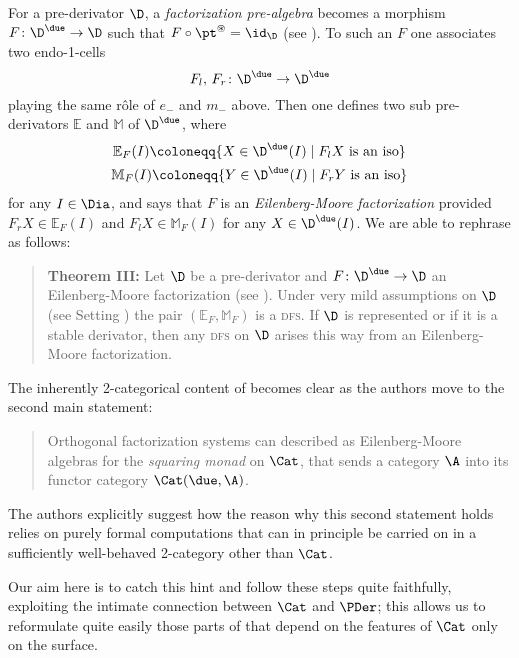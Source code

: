For a pre-derivator $\D$, a \emph{factorization pre-algebra}  becomes a morphism  $F\colon \D^\due\to \D$ such that $F\circ \pt^\circledast=\id_\D$ (see \adef{}). To such an $F$ one associates two endo-1-cells
\[
F_l,\, F_r\colon \D^\due\to \D^\due
\]
playing the same r\^ole of $e_{-}$ and $m_{-}$ above. Then one defines two sub pre-derivators $\mathbb E$ and $\mathbb M$ of $\D^\due$, where
\begin{gather*}
\mathbb E_F(I) \coloneqq \{X\in \D^\due(I) \mid F_lX\text{ is an iso}\}\\
\mathbb M_F(I) \coloneqq \{Y\in \D^\due(I) \mid F_rY\text{ is an iso}\}
\end{gather*}
for any $I\in \Dia$, and says that $F$ is an \emph{Eilenberg\hyp{}Moore factorization} provided $F_rX\in \mathbb E_F(I)$ and $F_lX\in \mathbb M_F(I)$ for any $X\in \D^\due(I)$. We are able to rephrase \cite[\athm\textbf{A}]{Korostenski199357} as follows:
\begin{quote}
\textbf{Theorem III:}
Let $\D$ be a pre-derivator and  $F\colon \D^\due\to \D$ an Eilenberg\hyp{}Moore factorization  (see \adef{}). Under very mild assumptions on $\D$ (see Setting )  the pair $(\mathbb E_F,\mathbb M_F)$ is a \textsc{dfs}. If $\D$ is represented or if it is a stable derivator, then any \textsc{dfs} on $\D$ arises this way from an Eilenberg\hyp{}Moore factorization.
\end{quote}
The inherently 2-categorical content of \cite{Korostenski199357} becomes clear as the authors move to the second main statement: \cite[\athm\textbf{B}]{Korostenski199357}
\begin{quote}
Orthogonal factorization systems can described as Eilenberg\hyp{}Moore algebras for the \emph{squaring monad} on $\Cat$, that sends a category $\A$ into its functor category $\Cat(\due,\A)$.
\end{quote}
The authors explicitly suggest how the reason why this second statement holds relies on purely formal computations that can in principle be carried on in a sufficiently well\hyp{}behaved 2-category other than $\Cat$.

Our aim here is to catch this hint and follow these steps quite faithfully, exploiting the intimate connection between $\Cat$ and $\PDer$; this allows us to reformulate quite easily those parts of \cite{Korostenski199357} that depend on the features of $\Cat$ only on the surface.

